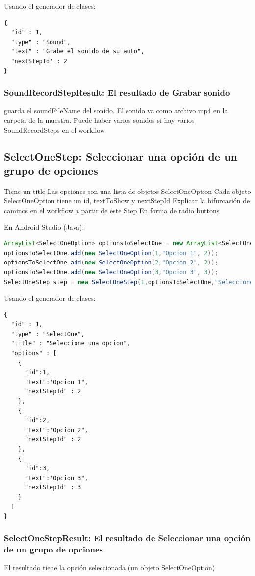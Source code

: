 Usando el generador de clases:
\begin{lstlisting}[language=XML, frame=tlb]	
{
  "id" : 1,
  "type" : "Sound",
  "text" : "Grabe el sonido de su auto",
  "nextStepId" : 2
}
\end{lstlisting}

\subsubsection{SoundRecordStepResult: El resultado de Grabar sonido}
guarda el soundFileName del sonido.
El sonido va como archivo mp4 en la carpeta de la muestra.
Puede haber varios sonidos si hay varios SoundRecordSteps en el workflow


\subsection{SelectOneStep: Seleccionar una opción de un grupo de opciones}
Tiene un title
Las opciones son una lista de objetos SelectOneOption
Cada objeto SelectOneOption tiene un id, textToShow y nextStepId
Explicar la bifurcación de caminos en el workflow a partir de este Step
En forma de radio buttons

En Android Studio (Java):
\begin{lstlisting}[language=Java, frame=tlb]	
ArrayList<SelectOneOption> optionsToSelectOne = new ArrayList<SelectOneOption>();
optionsToSelectOne.add(new SelectOneOption(1,"Opcion 1", 2));
optionsToSelectOne.add(new SelectOneOption(2,"Opcion 2", 2));
optionsToSelectOne.add(new SelectOneOption(3,"Opcion 3", 3));
SelectOneStep step = new SelectOneStep(1,optionsToSelectOne,"Seleccione una opcion");

\end{lstlisting}

Usando el generador de clases:
\begin{lstlisting}[language=XML, frame=tlb]	
{
  "id" : 1,
  "type" : "SelectOne",
  "title" : "Seleccione una opcion",
  "options" : [
    {
      "id":1,
      "text":"Opcion 1",
      "nextStepId" : 2
    },
    {
      "id":2,
      "text":"Opcion 2",
      "nextStepId" : 2
    },
    {
      "id":3,
      "text":"Opcion 3",
      "nextStepId" : 3
    }
  ]
}
\end{lstlisting}

\subsubsection{SelectOneStepResult: El resultado de Seleccionar una opción de un grupo de opciones}
El resultado tiene la opción seleccionada (un objeto SelectOneOption)

